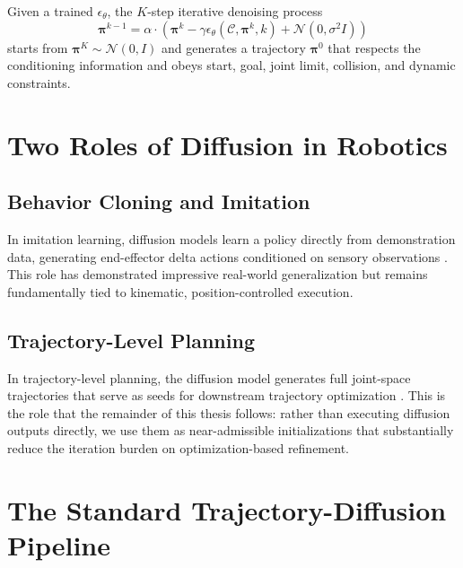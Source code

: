 Given a trained $\epsilon_\theta$, the $K$-step iterative denoising process
\begin{equation}
    \bm{\pi}^{k-1} = \alpha \cdot (\bm{\pi}^k - \gamma\epsilon_\theta(\mathcal{C}, \bm{\pi}^k, k) + \mathcal{N}(0, \sigma^2I))
\end{equation}
starts from $\bm{\pi}^K \sim \mathcal{N}(0, I)$ and generates a trajectory $\bm{\pi}^0$ that respects the conditioning information and obeys start, goal, joint limit, collision, and dynamic constraints.

\section{Two Roles of Diffusion in Robotics}
\label{sec:generation:roles}

\subsection{Behavior Cloning and Imitation}
\label{sec:generation:bc}

In imitation learning, diffusion models learn a policy directly from demonstration data, generating end-effector delta actions conditioned on sensory observations \cite{chi2023diffusionpolicy,sridhar2024nomad}. This role has demonstrated impressive real-world generalization but remains fundamentally tied to kinematic, position-controlled execution.

\subsection{Trajectory-Level Planning}
\label{sec:generation:planning}

In trajectory-level planning, the diffusion model generates full joint-space trajectories that serve as seeds for downstream trajectory optimization \cite{carvalho2023motion,huang2024diffusionseeder}. This is the role that the remainder of this thesis follows: rather than executing diffusion outputs directly, we use them as near-admissible initializations that substantially reduce the iteration burden on optimization-based refinement.

\section{The Standard Trajectory-Diffusion Pipeline}
\label{sec:generation:pipeline}

